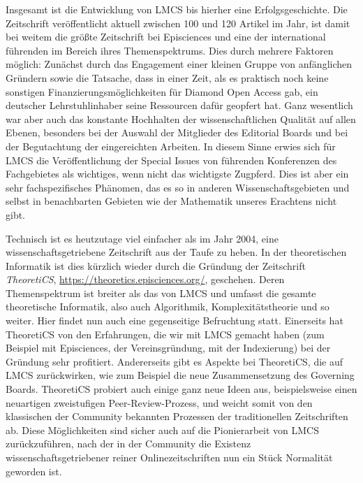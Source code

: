 \documentclass[a4paper,
fontsize=11pt,
oneside,
numbers=noperiodatend,
parskip=half-,
bibliography=totoc,
final
]{scrartcl}
\begin{document}
Insgesamt ist die Entwicklung von LMCS bis hierher eine
Erfolgsgeschichte. Die Zeitschrift veröffentlicht aktuell zwischen 100
und 120 Artikel im Jahr, ist damit bei weitem die größte Zeitschrift bei
Episciences und eine der international führenden im Bereich ihres
Themenspektrums. Dies durch mehrere Faktoren möglich: Zunächst durch das
Engagement einer kleinen Gruppe von anfänglichen Gründern sowie die
Tatsache, dass in einer Zeit, als es praktisch noch keine sonstigen
Finanzierungsmöglichkeiten für Diamond Open Access gab, ein deutscher
Lehrstuhlinhaber seine Ressourcen dafür geopfert hat. Ganz wesentlich
war aber auch das konstante Hochhalten der wissenschaftlichen Qualität
auf allen Ebenen, besonders bei der Auswahl der Mitglieder des Editorial
Boards und bei der Begutachtung der eingereichten Arbeiten. In diesem
Sinne erwies sich für LMCS die Veröffentlichung der Special Issues von
führenden Konferenzen des Fachgebietes als wichtiges, wenn nicht das
wichtigste Zugpferd. Dies ist aber ein sehr fachspezifisches Phänomen,
das es so in anderen Wissenschaftsgebieten und selbst in benachbarten
Gebieten wie der Mathematik unseres Erachtens nicht gibt.

Technisch ist es heutzutage viel einfacher als im Jahr 2004, eine
wissenschaftsgetriebene Zeitschrift aus der Taufe zu heben. In der
theoretischen Informatik ist dies kürzlich wieder durch die Gründung der
Zeitschrift \emph{TheoretiCS},
\url{https://theoretics.episciences.org/}, geschehen. Deren
Themenspektrum ist breiter als das von LMCS und umfasst die gesamte
theoretische Informatik, also auch Algorithmik, Komplexitätstheorie und
so weiter. Hier findet nun auch eine gegenseitige Befruchtung statt.
Einerseits hat TheoretiCS von den Erfahrungen, die wir mit LMCS gemacht
haben (zum Beispiel mit Episciences, der Vereinsgründung, mit der
Indexierung) bei der Gründung sehr profitiert. Andererseits gibt es
Aspekte bei TheoretiCS, die auf LMCS zurückwirken, wie zum Beispiel die
neue Zusammensetzung des Governing Boards. TheoretiCS probiert auch
einige ganz neue Ideen aus, beispielsweise einen neuartigen zweistufigen
Peer-Review-Prozess, und weicht somit von den klassischen der Community
bekannten Prozessen der traditionellen Zeitschriften ab. Diese
Möglichkeiten sind sicher auch auf die Pionierarbeit von LMCS
zurückzuführen, nach der in der Community die Existenz
wissenschaftsgetriebener reiner Onlinezeitschriften nun ein Stück
Normalität geworden ist.
\end{document}
